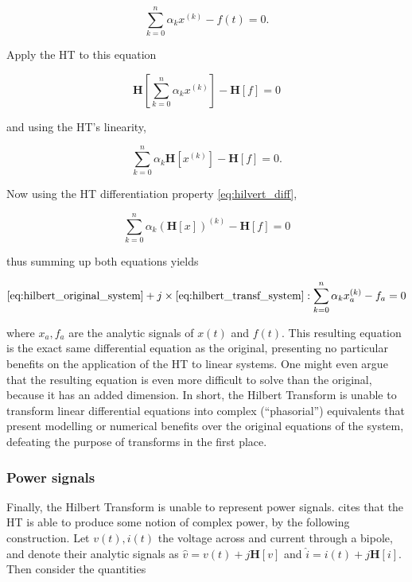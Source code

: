\begin{equation} \sum_{k=0}^n \alpha_k x^{(k)} - f(t) = 0.\label{eq:hilbert_original_system}\end{equation}

	Apply the HT to this equation

\begin{equation} \mathbf{H}\left[\sum_{k=0}^n \alpha_k x^{(k)}\right] - \mathbf{H}\left[f\right] = 0 \end{equation}

	\noindent and using the HT's linearity,

\begin{equation} \sum_{k=0}^n \alpha_k \mathbf{H}\left[x^{(k)}\right] - \mathbf{H}\left[f\right] = 0 .\end{equation}

	Now using the HT differentiation property \eqref{eq:hilvert_diff}, 

\begin{equation} \sum_{k=0}^n \alpha_k \left(\mathbf{H}\left[x\right]\right)^{(k)} - \mathbf{H}\left[f\right] = 0 \label{eq:hilbert_transf_system}\end{equation}

	\noindent thus summing up both equations yields

\begin{equation} \eqref{eq:hilbert_original_system} + j\times\eqref{eq:hilbert_transf_system}: \sum_{k=0}^n \alpha_k x_a^{(k)} - f_a = 0\end{equation}

	\noindent where $x_a,f_a$ are the analytic signals of $x(t)$ and $f(t)$. This resulting equation is the exact same differential equation as the original, presenting no particular benefits on the application of the HT to linear systems. One might even argue that the resulting equation is even more difficult to solve than the original, because it has an added dimension. In short, the Hilbert Transform is unable to transform linear differential equations into complex (``phasorial'') equivalents that present modelling or numerical benefits over the original equations of the system, defeating the purpose of transforms in the first place.

\subsubsection{Power signals}

	Finally, the Hilbert Transform is unable to represent power signals. \cite{derviskadicPhasorsModelingPower2020} cites that the HT is able to produce some notion of complex power, by the following construction. Let $v(t),i(t)$ the voltage across and current through a bipole, and denote their analytic signals as $\hat{v} = v(t) + j\mathbf{H}\left[v\right]$ and $\hat{i} = i(t) + j\mathbf{H}\left[i\right]$. Then consider the quantities

